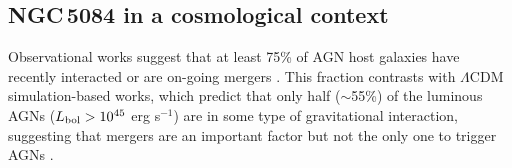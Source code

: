 \documentclass[modern]{CORE-AAS/aastex631}
\begin{document}
{%

\subsection{NGC\,5084 in a cosmological context}
\label{subsec:origin_of_NGC5084}

Observational works suggest that at least 75\% of AGN host galaxies have recently interacted or are on-going mergers \citep{keel+2012mnras420_878}. This fraction contrasts with $\Lambda$CDM simulation-based works, which predict that only half ($\sim$55\%) of the luminous AGNs ($L_{\rm bol} > 10^{45}$ erg s$^{-1}$) are in some type of gravitational interaction, suggesting that mergers are an important factor but not the only one to trigger AGNs \citep{byrnemamahit+2024arXiv2402.05196}.

}
\end{document}
